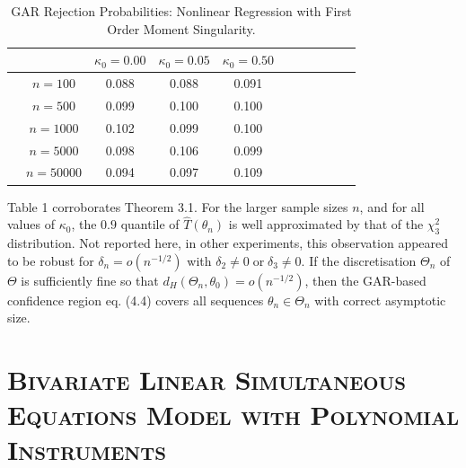 \documentclass[hidelinks, 11 pt, a4paper, pdflatex]{article}
\begin{document}
{   \begin{table}[h]
		
	\begin{center}
	 \begin{tabular}{ccccccccccc}
	  & & \multicolumn{1}{c}{$\kappa_0=0.00$} & \multicolumn{1}{c}{$\kappa_0=0.05$} & \multicolumn{1}{c}{$\kappa_0=0.50$}  \\
	  \hline
      \hline
	  & $n=100$  & 0.088 & 0.088 & 0.091 \\ [0.3cm]
	  & $n=500$  & 0.099 & 0.100 & 0.100 \\  [0.3cm]
	  & $n=1000$ & 0.102 & 0.099 & 0.100 \\ [0.3cm]
	  & $n=5000$ & 0.098 & 0.106 & 0.099 \\ [0.3cm]
	  & $n=50000$& 0.094 & 0.097 & 0.109 \\ [0.3cm]
	 \end{tabular}
    \end{center}
   \caption{GAR Rejection Probabilities: Nonlinear Regression with First Order Moment Singularity.}
   \end{table}

  Table 1 corroborates Theorem 3.1. For the larger sample sizes $n$, and for all values of $\kappa_0$, the $0.9$ quantile of $\hat{T}(\theta_n)$ is well approximated by that of the $\chi_3^2$ distribution. Not reported here, in other experiments, this observation appeared to be  robust for $\delta_n = o(n^{-1/2})$ with $\delta_2 \neq 0 \; \text{or} \; \delta_3 \neq 0$. If the discretisation $\Theta_n$ of $\Theta$ is sufficiently fine so that $d_H(\Theta_n,\theta_0) = o(n^{-1/2})$, then the GAR-based confidence region eq. (4.4) covers all sequences $\theta_n \in \Theta_n$ with correct asymptotic size.



 \section{\textsc{Bivariate Linear Simultaneous Equations Model with Polynomial Instruments}} \label{Simulation:Lin.Simult.Eqn}

}
\end{document}
